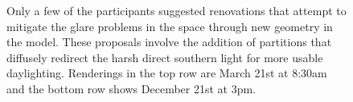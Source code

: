 \begin{figure}[t]
\caption{Only a few of the participants suggested renovations that
  attempt to mitigate the glare problems in the space through new
  geometry in the model.  These proposals involve the addition of
  partitions that diffusely redirect the harsh direct southern light
  for more usable daylighting.
 Renderings in the top row are March 21st at 8:30am and the bottom
  row shows December 21st at 3pm.
%
}
\label{figure:diffusing_renovations}
\vspace{-0.1in}
\end{figure}
